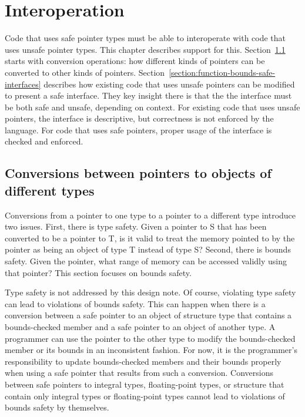 
\newcommand{\boundscast}[2]{\texttt{bounds\_cast<#1>#2}}
\newcommand{\coreboundscast}[2]{\texttt{core\_bounds\_cast<#1>#2}}
\newcommand{\assumeboundscast}[2]{\texttt{assume\_bounds\_cast<#1>#2}}
\newcommand{\ptrcast}[2]{\texttt{bounds\_cast<#1>#2}}

\chapter{Interoperation}
\label{chapter:interoperation}

Code that uses safe pointer types must be able to interoperate with
code that uses unsafe pointer types.  This chapter describes support
for this.  Section~\ref{section:pointer-casting} starts with
conversion operations: how different kinds of pointers can
be converted to other kinds of pointers.  
Section~\ref{section:function-bounds-safe-interfaces}
describes how existing code that uses unsafe pointers can be modified
to present a safe interface.  They key insight there is that the
the interface must be both safe and unsafe, depending on context.
For existing code that uses unsafe pointers, the interface is descriptive,
but correctness is not enforced by the language.  For code that uses safe
pointers, proper usage of the interface is checked and enforced.

\section{Conversions between pointers to objects of different types}
\label{section:pointer-casting}

Conversions from a pointer to one type to a pointer to a different type
introduce two issues. First, there is type safety. Given a pointer to S
that has been converted to be a pointer to T, is it valid to treat the
memory pointed to by the pointer as being an object of type T instead of
type S? Second, there is bounds safety. Given the pointer, what range of
memory can be accessed validly using that pointer? This section focuses on
bounds safety.

Type safety is not addressed by this design note. Of course, violating
type safety can lead to violations of bounds safety. This can happen
when there is a conversion between a safe pointer to an object of
structure type that contains a bounds-checked member and a safe pointer
to an object of another type. A programmer can use the pointer to the
other type to modify the bounds-checked member or its bounds in an
inconsistent fashion. For now, it is the programmer's responsibility to
update bounds-checked members and their bounds properly when using a
safe pointer that results from such a conversion. Conversions between
safe pointers to integral types, floating-point types, or structure that
contain only integral types or floating-point types cannot lead to
violations of bounds safety by themselves.

